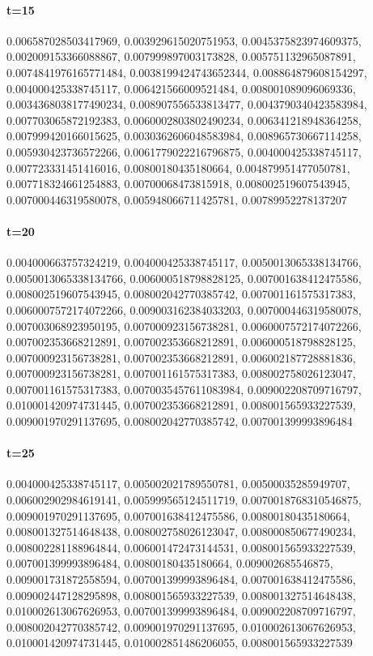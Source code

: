 \documentclass{article}
\begin{document}
\paragraph{t=15}
0.006587028503417969, 0.003929615020751953, 0.0045375823974609375, 0.002009153366088867, 0.007999897003173828, 0.005751132965087891, 0.0074841976165771484, 0.0038199424743652344, 0.008864879608154297, 0.004000425338745117, 0.006421566009521484, 0.008001089096069336, 0.0034368038177490234, 0.008907556533813477, 0.0043790340423583984, 0.007703065872192383, 0.0060002803802490234, 0.006341218948364258, 0.007999420166015625, 0.0030362606048583984, 0.008965730667114258, 0.005930423736572266, 0.0061779022216796875, 0.004000425338745117, 0.007723331451416016, 0.00800180435180664, 0.004879951477050781, 0.007718324661254883, 0.00700068473815918, 0.008002519607543945, 0.007000446319580078, 0.005948066711425781, 0.00789952278137207


\paragraph{t=20}
0.004000663757324219, 0.004000425338745117, 0.0050013065338134766, 0.0050013065338134766, 0.006000518798828125, 0.007001638412475586, 0.008002519607543945, 0.008002042770385742, 0.007001161575317383, 0.0060007572174072266, 0.009003162384033203, 0.007000446319580078, 0.007003068923950195, 0.007000923156738281, 0.0060007572174072266, 0.007002353668212891, 0.007002353668212891, 0.006000518798828125, 0.007000923156738281, 0.007002353668212891, 0.006002187728881836, 0.007000923156738281, 0.007001161575317383, 0.008002758026123047, 0.007001161575317383, 0.0070035457611083984, 0.009002208709716797, 0.010001420974731445, 0.007002353668212891, 0.008001565933227539, 0.009001970291137695, 0.008002042770385742, 0.007001399993896484


\paragraph{t=25}
0.004000425338745117, 0.005002021789550781, 0.00500035285949707, 0.006002902984619141, 0.005999565124511719, 0.0070018768310546875, 0.009001970291137695, 0.007001638412475586, 0.00800180435180664, 0.008001327514648438, 0.008002758026123047, 0.008000850677490234, 0.008002281188964844, 0.006001472473144531, 0.008001565933227539, 0.007001399993896484, 0.00800180435180664, 0.009002685546875, 0.009001731872558594, 0.007001399993896484, 0.007001638412475586, 0.009002447128295898, 0.008001565933227539, 0.008001327514648438, 0.010002613067626953, 0.007001399993896484, 0.009002208709716797, 0.008002042770385742, 0.009001970291137695, 0.010002613067626953, 0.010001420974731445, 0.010002851486206055, 0.008001565933227539
\end{document}
